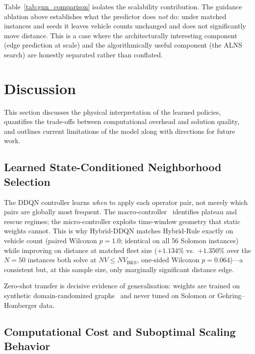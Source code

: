 \documentclass[conference]{IEEEtran}
\newcommand{\BKS}{\text{BKS}}
\begin{document}
Table~\ref{tab:gnn_comparison} isolates the scalability contribution. The
guidance ablation above establishes what the predictor does \emph{not} do:
under matched instances and seeds it leaves vehicle counts unchanged and does not
significantly move distance. This is a case where the architecturally interesting
component (edge prediction at scale) and the algorithmically useful component
(the ALNS search) are honestly separated rather than conflated.


\section{Discussion}
\label{sec:discussion}

This section discusses the physical interpretation of the learned policies, quantifies the trade-offs between computational overhead and solution quality, and outlines current limitations of the model along with directions for future work.

\subsection{Learned State-Conditioned Neighborhood Selection}

The DDQN controller learns \emph{when} to apply each operator pair, not merely
which pairs are globally most frequent.  The macro-controller~\cite{wang2016dueling}
identifies plateau and rescue regimes; the micro-controller exploits
time-window geometry that static weights cannot.  This is why Hybrid-DDQN
matches Hybrid-Rule exactly on vehicle count (paired Wilcoxon $p=1.0$; identical
on all 56 Solomon instances) while improving on distance at matched fleet size
($+1.134\%$ vs.\ $+1.350\%$ over the $N{=}50$ instances both solve at
$NV\le NV_{\BKS}$, one-sided Wilcoxon $p=0.064$)---a consistent but, at this
sample size, only marginally significant distance edge.

Zero-shot transfer is decisive evidence of generalisation: weights are trained on
synthetic domain-randomized graphs~\cite{tobin2017domain} and never tuned on
Solomon or Gehring--Homberger data.

\subsection{Computational Cost and Suboptimal Scaling Behavior}
\end{document}
